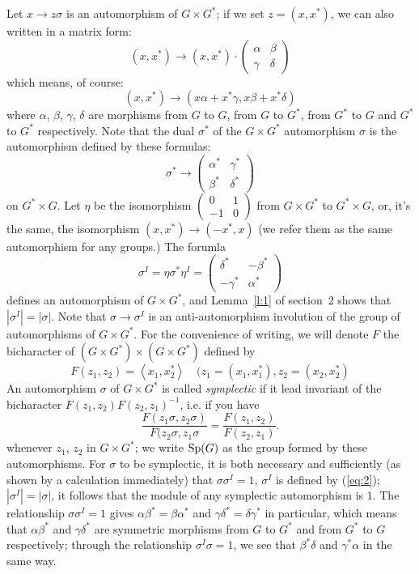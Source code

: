 \documentclass[12pt]{amsart}
\def\inn#1#2{\left\langle{#1},{#2}\right\rangle}
\def\abs#1{\left|{#1}\right|}
\def\Sp{{\rm Sp}}
\newcounter{ssection}
\renewcommand{\subsection}{
  \addtocounter{ssection}{1}{\bf  \arabic{ssection}.\  }}
\begin{document}
\subsection{}
Let $x\to z\sigma$ is an automorphism of $G\times G^*$; if we set
$z=(x,x^*)$, we can also written in a matrix form:
\[
(x,x^*)\to (x,x^*)\cdot 
\begin{pmatrix} 
\alpha & \beta \\
\gamma & \delta
\end{pmatrix}
\]
which means, of course:
\[
(x,x^*)\to (x\alpha + x^*\gamma,x\beta + x^*\delta)
\]
where $\alpha$, $\beta$, $\gamma$, $\delta$ are morphisms from $G$ to
$G$,
from $G$ to $G^*$, from $G^*$ to $G$ and $G^*$ to $G^*$ respectively. 
Note that the dual $\sigma^*$ of the $G\times G^*$ automorphism
$\sigma$ 
is the automorphism defined by these formulas:
\[
\sigma^* \to \begin{pmatrix}
\alpha^* & \gamma^* \\
\beta^* & \delta^*
\end{pmatrix}
\]
on $G^*\times G$.
Let $\eta$ be the isomorphism $\begin{pmatrix}0 & 1\\ -1 & 0\end{pmatrix}$ 
from $G\times G^*$ to $G^*\times G$, or, it's the same, 
the isomorphism $(x,x^*)\to (-x^*, x)$ (we refer them as the same automorphism  for any groups.)  The forumla
\begin{equation}\label{eq:2}
\sigma^I = \eta \sigma^* \eta^I = 
\begin{pmatrix} \delta^* & - \beta^*\\-\gamma^* & \alpha^*\end{pmatrix}
\end{equation}
defines an automorphism of $G\times G^*$, and Lemma~\ref{l:1} of section~2
shows that $\abs{\sigma^I}=\abs{\sigma}$. 
Note that $\sigma\to \sigma^I$ is an anti-automorphism involution of the
group of automorphisms of $G\times G^*$.
For the convenience of writing,  we will denote $F$ the bicharacter of 
$(G\times G^*)\times (G\times G^*)$ defined by 
\begin{equation}\label{eq:3}
F(z_1,z_2) = \inn{x_1}{x_2^*}\quad (z_1=(x_1,x_1^*), z_2=(x_2,x_2^*)
\end{equation}
An automorphism $\sigma$ of $G\times G^*$ is called {\it symplectic} if
it lead invariant of the bicharacter $F(z_1,z_2)F(z_2,z_1)^{-1}$, i.e. if
you have 
\[
\frac{F(z_1\sigma, z_2\sigma)}{F(z_2\sigma, z_1\sigma}= 
\frac{F(z_1, z_2)}{F(z_2,z_1)}.
\]
whenever $z_1$, $z_2$ in $G\times G^*$; we write $\Sp(G)$ as the group 
formed by these automorphisms. For $\sigma$ to be symplectic, 
it is both necessary and sufficiently (as shown by a calculation immediately) 
that $\sigma \sigma^I = 1$, $\sigma^I$ is defined by (\ref{eq:2});
$\abs{\sigma^I}=\abs{\sigma}$, it follows that the module of any symplectic 
automorphism is $1$. The relationship $\sigma \sigma^I=1$ gives 
$\alpha\beta^* = \beta\alpha^*$ and $\gamma \delta^*=\delta \gamma^*$ 
in particular, which means that $\alpha\beta^*$ and $\gamma \delta^*$
 are symmetric morphisms from $G$ to $G^*$ and from $G^*$ to $G$ respectively;
through the relationship $\sigma^I \sigma = 1$, we see that $\beta^*\delta$ and
$\gamma^*\alpha$ in the same way.
\end{document}

